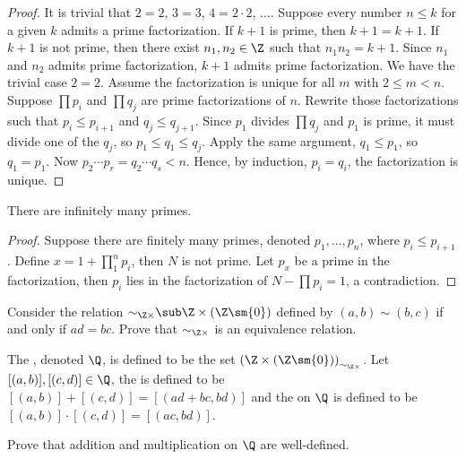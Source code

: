 \documentclass[10pt]{article}
\begin{document}
\begin{proof}
    It is trivial that $2=2$, $3=3$, $4=2\cdot 2$, $\dots$. Suppose every number $n\le k$ for a given $k$ admits a prime factorization. If $k+1$ is prime, then $k+1=k+1$. If $k+1$ is not prime, then there exist ${n}_{1},{n}_{2}\in\Z$ such that ${n}_{1}{n}_{2}=k+1$. Since ${n}_{1}$ and ${n}_{2}$ admits prime factorization, $k+1$ admits prime factorization. We have the trivial case $2=2$. Assume the factorization is unique for all $m$ with $2\le m<n$. Suppose $\prod{p}_{i}$ and $\prod{q}_{j}$ are prime factorizations of $n$. Rewrite those factorizations such that ${p}_{i}\le{p}_{i+1}$ and ${q}_{j}\le{q}_{j+1}$. Since ${p}_{1}$ divides $\prod{q}_{j}$ and ${p}_{1}$ is prime, it must divide one of the ${q}_{j}$, so ${p}_{1}\le{q}_{1}\le{q}_{j}$. Apply the same argument, ${q}_{1}\le{p}_{1}$, so ${q}_{1}={p}_{1}$. Now ${p}_{2}\cdots{p}_{r}={q}_{2}\cdots{q}_{s}<n$. Hence, by induction, ${p}_{i}={q}_{i}$, the factorization is unique.
\end{proof}
\begin{theorem}
    There are infinitely many primes.
\end{theorem}
\begin{proof}
    Suppose there are finitely many primes, denoted ${p}_{1},\dots,{p}_{n}$, where ${p}_{i}\le{p}_{i+1}$. Define $x=1+{\prod}_{1}^{n}{p}_{i}$, then $N$ is not prime. Let ${p}_{x}$ be a prime in the factorization, then ${p}_{i}$ lies in the factorization of $N-{\prod}{p}_{i}=1$, a contradiction.
\end{proof}
\begin{problem}
    Consider the relation ${\sim}_{\Z\times}\sub\Z\times(\Z\sm\{0\})$ defined by $(a,b)\sim(b,c)$ if and only if $ad=bc$. Prove that ${\sim}_{\Z\times}$ is an equivalence relation.
\end{problem}
\begin{definition}
    The , denoted $\Q$, is defined to be the set ${(\Z\times(\Z\sm\{0\}))}_{{\sim}_{\Z\times}}$. Let $[(a,b)],[(c,d)]\in\Q$, the  is defined to be $[(a,b)]+[(c,d)]=[(ad+bc,bd)]$ and the  on $\Q$ is defined to be $[(a,b)]\cdot[(c,d)]=[(ac,bd)]$.
\end{definition}
\begin{problem}
    Prove that addition and multiplication on $\Q$ are well-defined.
\end{problem}
\end{document}
